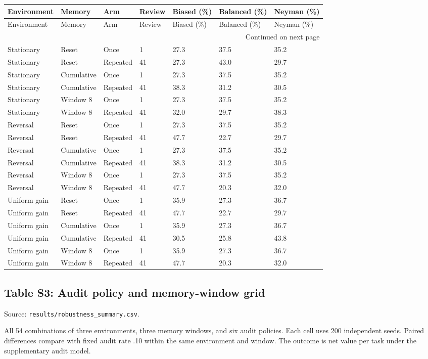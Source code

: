 \begin{longtable}{@{}lllllll@{}}
\toprule Environment & Memory & Arm & Review & Biased (\%) & Balanced (\%) & Neyman (\%) \\\midrule\endfirsthead
\toprule Environment & Memory & Arm & Review & Biased (\%) & Balanced (\%) & Neyman (\%) \\\midrule\endhead
\midrule\multicolumn{7}{r}{Continued on next page}\\\endfoot
\bottomrule\endlastfoot
Stationary & Reset & Once & 1 & 27.3 & 37.5 & 35.2 \\
Stationary & Reset & Repeated & 41 & 27.3 & 43.0 & 29.7 \\
Stationary & Cumulative & Once & 1 & 27.3 & 37.5 & 35.2 \\
Stationary & Cumulative & Repeated & 41 & 38.3 & 31.2 & 30.5 \\
Stationary & Window 8 & Once & 1 & 27.3 & 37.5 & 35.2 \\
Stationary & Window 8 & Repeated & 41 & 32.0 & 29.7 & 38.3 \\
Reversal & Reset & Once & 1 & 27.3 & 37.5 & 35.2 \\
Reversal & Reset & Repeated & 41 & 47.7 & 22.7 & 29.7 \\
Reversal & Cumulative & Once & 1 & 27.3 & 37.5 & 35.2 \\
Reversal & Cumulative & Repeated & 41 & 38.3 & 31.2 & 30.5 \\
Reversal & Window 8 & Once & 1 & 27.3 & 37.5 & 35.2 \\
Reversal & Window 8 & Repeated & 41 & 47.7 & 20.3 & 32.0 \\
Uniform gain & Reset & Once & 1 & 35.9 & 27.3 & 36.7 \\
Uniform gain & Reset & Repeated & 41 & 47.7 & 22.7 & 29.7 \\
Uniform gain & Cumulative & Once & 1 & 35.9 & 27.3 & 36.7 \\
Uniform gain & Cumulative & Repeated & 41 & 30.5 & 25.8 & 43.8 \\
Uniform gain & Window 8 & Once & 1 & 35.9 & 27.3 & 36.7 \\
Uniform gain & Window 8 & Repeated & 41 & 47.7 & 20.3 & 32.0 \\
\end{longtable}\endgroup
\clearpage
\subsection*{Table S3: Audit policy and memory-window grid}
\label{supp:S3}
{\footnotesize Source: \texttt{results/robustness\_summary.csv}.}\par All 54 combinations of three environments, three memory windows, and six audit policies. Each cell uses 200 independent seeds. Paired differences compare with fixed audit rate .10 within the same environment and window. The outcome is net value per task under the supplementary audit model.


